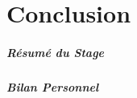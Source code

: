 \chapter{Conclusion}
\paragraph{Résumé du Stage}
    \lipsum[1]

\paragraph{Bilan Personnel}
    \lipsum[1]